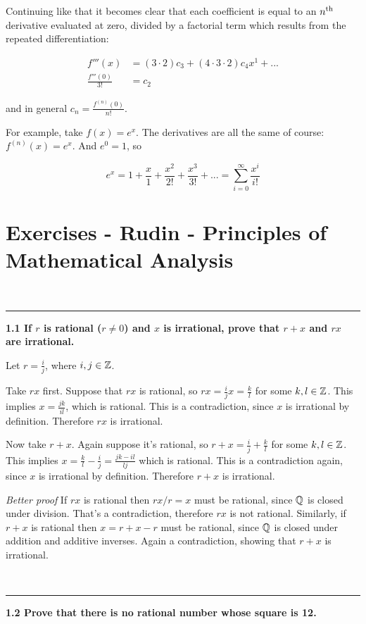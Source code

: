 Continuing like that it becomes clear that each coefficient is equal to an $n^{\text{th}}$ derivative evaluated at zero, divided by a factorial term which results from the repeated differentiation:

\begin{align*}
f'''(x) &= (3\cdot2)c_3 + (4\cdot3\cdot2)c_4x^1 + ... \\
\frac{f'''(0)}{3!} &= c_2
\end{align*}

and in general $c_n = \frac{f^{(n)}(0)}{n!}$.

For example, take $f(x) = e^x$. The derivatives are all the same of course: $f^{(n)}(x) = e^x$. And $e^0 = 1$, so

$$
e^x = 1 + \frac{x}{1} + \frac{x^2}{2!} + \frac{x^3}{3!} + ... = \sum_{i=0}^\infty \frac{x^i}{i!}
$$
\section{Exercises - Rudin - Principles of Mathematical Analysis}

~\\\hrule
\textbf{1.1 If $r$ is rational ($r \neq 0$) and $x$ is irrational, prove that $r + x$
and $rx$ are irrational.}

Let $r = \frac{i}{j}$, where $i, j \in \mathbb{Z}$.

Take $rx$ first. Suppose that $rx$ is rational, so $rx = \frac{i}{j}x =
\frac{k}{l}$ for some $k, l \in \mathbb{Z}$. This implies $x = \frac{jk}{il}$, which is
rational. This is a contradiction, since $x$ is irrational by
definition. Therefore $rx$ is irrational.

Now take $r + x$. Again suppose it's rational, so $r + x = \frac{i}{j} +
\frac{k}{l}$ for some $k, l \in \mathbb{Z}$. This implies $x = \frac{k}{l} -
\frac{i}{j} = \frac{jk - il}{lj}$ which is rational. This is a contradiction
again, since $x$ is irrational by definition. Therefore $r + x$ is irrational.

\textit{Better proof} If $rx$ is rational then $rx/r = x$ must be rational, since $\mathbb{Q}$
is closed under division. That's a contradiction, therefore $rx$ is not
rational. Similarly, if $r + x$ is rational then $x = r + x - r$ must be
rational, since $\mathbb{Q}$ is closed under addition and additive inverses. Again a
contradiction, showing that $r+x$ is irrational.

~\\\hrule
\textbf{1.2 Prove that there is no rational number whose square is 12.}

